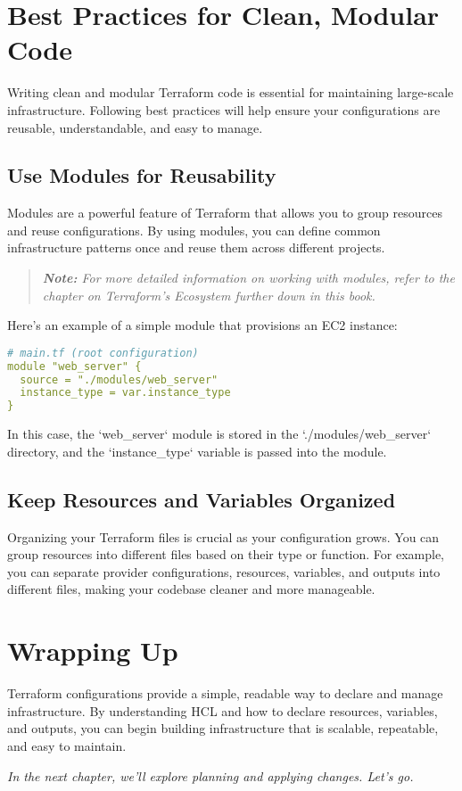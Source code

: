\section{Best Practices for Clean, Modular Code}

Writing clean and modular Terraform code is essential for maintaining large-scale infrastructure. Following best practices will help ensure your configurations are reusable, understandable, and easy to manage.

\subsection{Use Modules for Reusability}

Modules are a powerful feature of Terraform that allows you to group resources and reuse configurations. By using modules, you can define common infrastructure patterns once and reuse them across different projects. 

\begin{quote}
\textit{\textbf{Note:} For more detailed information on working with modules, refer to the chapter on Terraform's Ecosystem further down in this book.}
\end{quote}

Here's an example of a simple module that provisions an EC2 instance:

\begin{lstlisting}[language=yaml]
# main.tf (root configuration)
module "web_server" {
  source = "./modules/web_server"
  instance_type = var.instance_type
}
\end{lstlisting}

In this case, the `web\_server` module is stored in the `./modules/web\_server` directory, and the `instance\_type` variable is passed into the module.

\subsection{Keep Resources and Variables Organized}

Organizing your Terraform files is crucial as your configuration grows. You can group resources into different files based on their type or function. For example, you can separate provider configurations, resources, variables, and outputs into different files, making your codebase cleaner and more manageable.

\section{Wrapping Up}

Terraform configurations provide a simple, readable way to declare and manage infrastructure. By understanding HCL and how to declare resources, variables, and outputs, you can begin building infrastructure that is scalable, repeatable, and easy to maintain.

\vspace{1em}

\textit{In the next chapter, we'll explore planning and applying changes. Let's go.}
